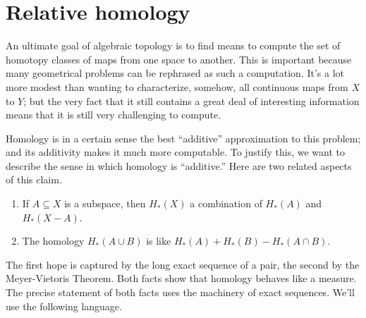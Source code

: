 \section{Relative homology}

An ultimate goal of algebraic topology is to find means to compute the set of homotopy classes of maps from one space to another. This is important because many geometrical problems can be rephrased as such a computation. It's a lot more modest than wanting to characterize, somehow, all continuous maps from $X$ to $Y$; but the very fact that it still contains a great deal of interesting information means that it is still very challenging to compute. 

Homology is in a certain sense the best ``additive'' approximation to this problem; and its additivity makes it much more computable. To justify this, we want to describe the sense in which homology is ``additive.'' Here are two related aspects of this claim.
	\begin{enumerate}
	\item If $A\subseteq X$ is a subspace, then $ H_\ast(X)$ a combination of $ H_\ast(A)$ and $H_\ast(X-A)$. 
	\item The homology $ H_\ast(A\cup B)$ is like $ H_\ast(A)+ H_\ast(B)- H_\ast(A\cap B)$. 
	\end{enumerate}
The first hope is captured by the long exact sequence of a pair, the second
by the Meyer-Vietoris Theorem. 
Both facts show that homology behaves like a measure. 
The precise statement of both facts uses the machinery of exact sequences.
We'll use the following language.

